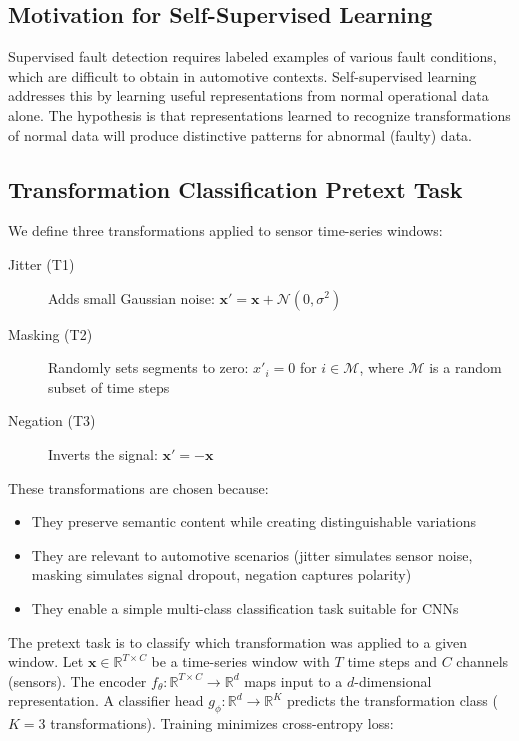 \subsection{Motivation for Self-Supervised Learning}

Supervised fault detection requires labeled examples of various fault conditions, which are difficult to obtain in automotive contexts. Self-supervised learning addresses this by learning useful representations from normal operational data alone. The hypothesis is that representations learned to recognize transformations of normal data will produce distinctive patterns for abnormal (faulty) data.

\subsection{Transformation Classification Pretext Task}

We define three transformations applied to sensor time-series windows:

\begin{description}
    \item[Jitter (T1)] Adds small Gaussian noise: $\mathbf{x}' = \mathbf{x} + \mathcal{N}(0, \sigma^2)$

    \item[Masking (T2)] Randomly sets segments to zero: $x'_i = 0$ for $i \in \mathcal{M}$, where $\mathcal{M}$ is a random subset of time steps

    \item[Negation (T3)] Inverts the signal: $\mathbf{x}' = -\mathbf{x}$
\end{description}

These transformations are chosen because:
\begin{itemize}
    \item They preserve semantic content while creating distinguishable variations
    \item They are relevant to automotive scenarios (jitter simulates sensor noise, masking simulates signal dropout, negation captures polarity)
    \item They enable a simple multi-class classification task suitable for CNNs
\end{itemize}

The pretext task is to classify which transformation was applied to a given window. Let $\mathbf{x} \in \mathbb{R}^{T \times C}$ be a time-series window with $T$ time steps and $C$ channels (sensors). The encoder $f_\theta: \mathbb{R}^{T \times C} \rightarrow \mathbb{R}^{d}$ maps input to a $d$-dimensional representation. A classifier head $g_\phi: \mathbb{R}^{d} \rightarrow \mathbb{R}^{K}$ predicts the transformation class ($K=3$ transformations). Training minimizes cross-entropy loss:

